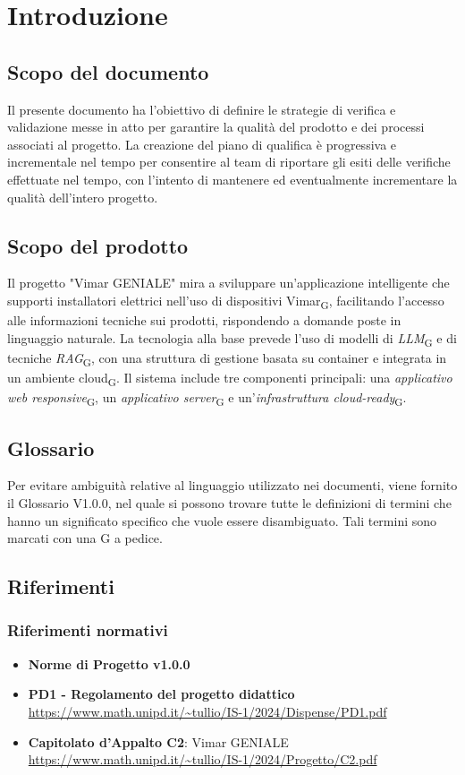 \section{Introduzione}
\subsection{Scopo del documento}
Il presente documento ha l'obiettivo di definire le strategie di verifica e validazione messe in atto per garantire la qualità del prodotto e dei processi associati al progetto. La creazione del piano di qualifica è progressiva e incrementale nel tempo
per consentire al team di riportare gli esiti delle verifiche effettuate nel tempo, con l'intento di mantenere ed eventualmente incrementare la qualità dell'intero progetto.
\subsection{Scopo del prodotto}
Il progetto "Vimar GENIALE" mira a sviluppare un'applicazione intelligente che supporti installatori elettrici nell'uso di dispositivi Vimar\textsubscript{G}, facilitando l'accesso alle informazioni tecniche sui prodotti, rispondendo a domande poste in linguaggio naturale.
La tecnologia alla base prevede l'uso di modelli di \textit{LLM}\textsubscript{G} e di tecniche \textit{RAG}\textsubscript{G}, con una struttura di gestione basata su container e integrata in un ambiente cloud\textsubscript{G}.
Il sistema include tre componenti principali: una \textit{applicativo web responsive}\textsubscript{G}, un \textit{applicativo server}\textsubscript{G} e un'\textit{infrastruttura cloud-ready}\textsubscript{G}. 
\subsection{Glossario}
Per evitare ambiguità relative al linguaggio utilizzato nei documenti, viene fornito il Glossario V1.0.0, nel quale si possono trovare tutte le definizioni di termini che hanno un significato specifico che vuole essere disambiguato. Tali termini sono marcati con una G a pedice.
\subsection{Riferimenti}
\subsubsection{Riferimenti normativi}
\begin{itemize}
    \item \textbf{Norme di Progetto v1.0.0}
    \item \textbf{PD1 - Regolamento del progetto didattico} \\
    \url{https://www.math.unipd.it/~tullio/IS-1/2024/Dispense/PD1.pdf} 
    \item \textbf{Capitolato d'Appalto C2}: Vimar GENIALE \\
    \url{https://www.math.unipd.it/~tullio/IS-1/2024/Progetto/C2.pdf}
    \end{itemize}
